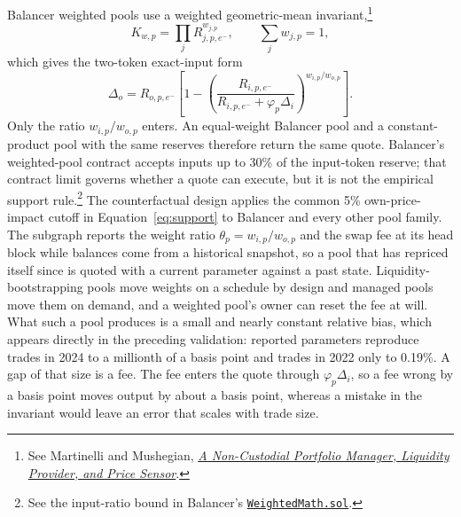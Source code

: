 Balancer weighted pools use a weighted geometric-mean invariant,\footnote{See Martinelli and Mushegian, \href{https://docs.balancer.fi/whitepaper.pdf}{\emph{A Non-Custodial Portfolio Manager, Liquidity Provider, and Price Sensor}}.}
\[
K_{w,p}=\prod_jR_{j,p,e^-}^{w_{j,p}},
\qquad \sum_jw_{j,p}=1,
\]
which gives the two-token exact-input form
\[
\Delta_o=R_{o,p,e^-}\left[1-\left(
\frac{R_{i,p,e^-}}{R_{i,p,e^-}+\varphi_p\Delta_i}
\right)^{w_{i,p}/w_{o,p}}\right].
\]
Only the ratio $w_{i,p}/w_{o,p}$ enters. An equal-weight Balancer pool and a constant-product pool with the same reserves therefore return the same quote. Balancer's weighted-pool contract accepts inputs up to 30\% of the input-token reserve; that contract limit governs whether a quote can execute, but it is not the empirical support rule.\footnote{See the input-ratio bound in Balancer's \href{https://github.com/balancer/balancer-v2-monorepo/blob/master/pkg/pool-weighted/contracts/WeightedMath.sol}{\texttt{WeightedMath.sol}}.} The counterfactual design applies the common 5\% own-price-impact cutoff in Equation~\eqref{eq:support} to Balancer and every other pool family. The subgraph reports the weight ratio $\theta_p=w_{i,p}/w_{o,p}$ and the swap fee at its head block while balances come from a historical snapshot, so a pool that has repriced itself since is quoted with a current parameter against a past state. Liquidity-bootstrapping pools move weights on a schedule by design and managed pools move them on demand, and a weighted pool's owner can reset the fee at will. What such a pool produces is a small and nearly constant relative bias, which appears directly in the preceding validation: reported parameters reproduce trades in 2024 to a millionth of a basis point and trades in 2022 only to 0.19\%. A gap of that size is a fee. The fee enters the quote through $\varphi_p\Delta_i$, so a fee wrong by a basis point moves output by about a basis point, whereas a mistake in the invariant would leave an error that scales with trade size.

